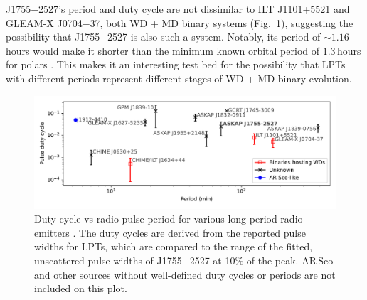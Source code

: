 \documentclass[fleqn,usenatbib]{mnras}
\newcommand{\revision}[2]{{\color{red}#2}}
\newcommand{\src}{J1755$-$2527}
\newcommand{\Fig}{Fig.}
\begin{document}
\src{}'s period and duty cycle are not dissimilar to ILT J1101+5521 and GLEAM-X J0704$-$37, \revision{which are conjectured to be on the evolutionary path towards becoming polars}{both WD + MD binary systems} (\Fig~\ref{fig:lpt_comparison}), suggesting the possibility that \src{} is also such a system.
Notably, its period of ${\sim}1.16\,$hours would make it shorter than the minimum known orbital period of $1.3\,$hours for \revision{confirmed}{} polars \citep{2009MNRAS.397.2170G,schwope2025polarcatcatalogpolarslowaccretion}.
This makes it an interesting test bed for the possibility that LPTs with different periods represent different stages of \revision{WD binary evolution, as they progress towards becoming polars}{WD + MD binary evolution}.
\begin{figure}
    \centering
    \includegraphics[width=0.98\linewidth]{lpt_comparison.pdf}
    \caption{Duty cycle vs radio pulse period for various long period radio emitters \citep{deRuiter2025,2022Natur.601..526H,2023Natur.619..487H,2024NatAs...8.1159C,2005Natur.434...50H,deRuiter2025,Lee2025,2024arXiv241116606W}. The duty cycles are derived from the reported pulse widths for LPTs, which are compared to the range of the fitted, unscattered pulse widths of \src{} at 10\% of the peak. AR\,Sco \citep{2016Natur.537..374M,2018A&A...611A..66S} and other sources without well-defined duty cycles or periods \citep[e.g.][and references therein]{2021ApJ...920...45W} are not included on this plot.}
    \label{fig:lpt_comparison}
\end{figure}
\end{document}
